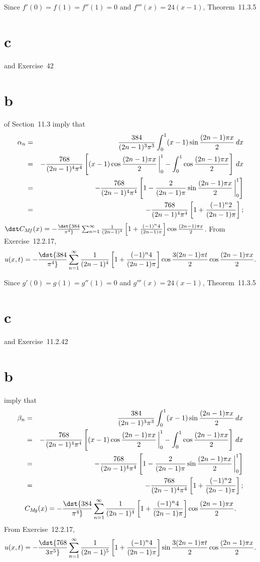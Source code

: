 \documentclass[dvips]{book}
\renewcommand{\exer}[1]{\par\medskip\;\noindent{\color{red}\bf #1.}}
\numberwithin{example}{section}
\numberwithin{equation}{section}
\numberwithin{theorem}{section}
\numberwithin{table}{section}
\numberwithin{figure}{section}
\newcommand{\lims}[2]{\,\bigg|_{#1}^{#2}}
\begin{document}
\exer{12.2.26}
Since $f'(0)=f(1)=f''(1)=0$ and $f'''(x)=24(x-1)$,
Theorem~11.3.5\part{c}  and Exercise~42\part{b} of
Section~11.3 imply that
\begin{eqnarray*}
\alpha_n&=&
{384\over(2n-1)^3\pi^3}
\int_0^1(x-1)\sin{(2n-1)\pi x\over2}\,dx\\
&=&-{768\over(2n-1)^4\pi^4}\left[(x-1)\cos{(2n-1)\pi x\over2}
\lims01-\int_0^1\cos{(2n-1)\pi x\over2}\right]\,dx\\
&=&-{768\over(2n-1)^4\pi^4}
\left[1-{2\over(2n-1)\pi}\sin{(2n-1)\pi x\over2}
\lims01\right] \\
&=&-{768\over(2n-1)^4\pi^4}
\left[1+{(-1)^n2\over(2n-1)\pi}\right];
\end{eqnarray*}
$\dst
C_{M\!f}(x)=-\dst{384\over\pi^4}\sum_{n=1}^\infty{1\over(2n-1)^4}\left[
1+{(-1)^n4\over(2n-1)\pi}\right]\cos{(2n-1)\pi
x\over2}$.
From Exercise~12.2.17,
$$
u(x,t)=-\dst{384\over\pi^4}\sum_{n=1}^\infty{1\over(2n-1)^4}\left[
1+{(-1)^n4\over(2n-1)\pi}\right]\cos{3(2n-1)\pi t\over2}\cos{(2n-1)\pi
x\over2}.
$$


\exer{12.2.28}
Since $g'(0)=g(1)=g''(1)=0$ and $g'''(x)=24(x-1)$,
Theorem~11.3.5\part{c}  and Exercise~11.2.42\part{b}
 imply that
\begin{eqnarray*}
\beta_n&=&
{384\over(2n-1)^3\pi^3}
\int_0^1(x-1)\sin{(2n-1)\pi x\over2}\,dx\\
&=&-{768\over(2n-1)^4\pi^4}\left[(x-1)\cos{(2n-1)\pi x\over2}
\lims01-\int_0^1\cos{(2n-1)\pi x\over2}\right]\,dx\\
&=&-{768\over(2n-1)^4\pi^4}
\left[1-{2\over(2n-1)\pi}\sin{(2n-1)\pi x\over2}
\lims01\right] \\
&=&-{768\over(2n-1)^4\pi^4}
\left[1+{(-1)^n2\over(2n-1)\pi}\right];
\end{eqnarray*}
$$
C_{M\!g}(x)=-\dst{384\over\pi^4}\sum_{n=1}^\infty{1\over(2n-1)^4}\left[
1+{(-1)^n4\over(2n-1)\pi}\right]\cos{(2n-1)\pi
x\over2}.
$$
From Exercise~12.2.17,
$$
u(x,t)=-\dst{768\over3\pi^5}\sum_{n=1}^\infty{1\over(2n-1)^5}\left[
1+{(-1)^n4\over(2n-1)\pi}\right]\sin{3(2n-1)\pi t\over2}\cos{(2n-1)\pi
x\over2}.
$$
\end{document}
